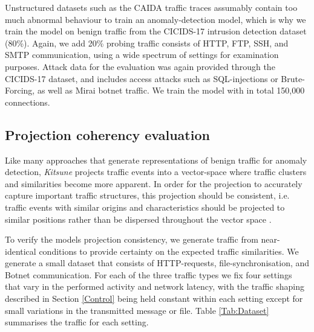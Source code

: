 \documentclass[runningheads]{llncs}
\begin{document}
Unstructured datasets such as the CAIDA traffic traces assumably contain too much abnormal behaviour to train an anomaly-detection model, which is why we train the model on benign traffic from the CICIDS-17 \cite{sharafaldin2018toward} intrusion detection dataset (80\%). Again, we add 20\% probing traffic consists of HTTP, FTP, SSH, and SMTP communication, using a wide spectrum of settings for examination purposes. Attack data for the evaluation was again provided through the CICIDS-17 dataset, and includes access attacks such as SQL-injections or Brute-Forcing, as well as Mirai botnet traffic. We  train the model with in total 150,000 connections.

\subsection{Projection coherency evaluation}


Like many approaches that generate representations of benign traffic for anomaly detection, \textit{Kitsune} projects traffic events into a vector-space where traffic clusters and similarities become more apparent. In order for the projection to accurately capture important traffic structures, this projection should be consistent, i.e. traffic events with similar origins and characteristics should be projected to similar positions rather than be dispersed throughout the vector space \cite{hou2017deep}.


To verify the models projection consistency, we generate traffic from near-identical conditions to provide certainty on the expected traffic similarities. We generate a small dataset that consists of HTTP-requests, file-synchronisation, and Botnet communication. For each of the three traffic types we fix four settings that vary in the performed activity and network latency, with the traffic shaping described in Section \ref{Control} being held constant within each setting except for small variations in the transmitted message or file. Table \ref{Tab:Dataset} summarises the traffic for each setting. 
\end{document}
